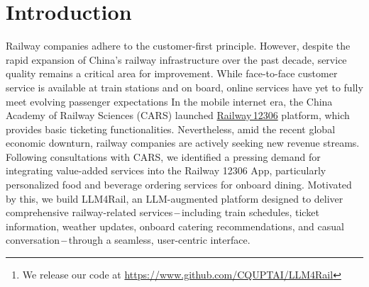 \documentclass[runningheads]{llncs}
\begin{document}
\begin{abstract}
Large language models (LLMs) have significantly reshaped different walks of business. 
To meet the increasing demands for individualized railway service, we develop LLM4Rail\footnote{We release our code at \href{https://www.github.com/CQUPTAI/LLM4Rail}{https://www.github.com/CQUPTAI/LLM4Rail}}\,\textbf{--}\,a novel LLM-augmented personalized railway services platform.
Empowered by the LLM, LLM4Rail provides dedicated modules for ticket and weather inquiries, food \& drink recommendations, and casual conversation.
In LLM4Rail, we propose the iterative ``Experience-Retrieval Question-Thought-Action-Observation (ER-QTAO)'' reasoning framework.
It introduces two key mechanisms, Experience Storage and Retrieval (ESR) and Diagnostic Observation Generation (DOG), to enhance the LLM's ability to invoke appropriate external tools with complex arguments.
To provide personalized onboard dining services, we first construct the 
Chinese Railway Food \& Drink (CRFD) dataset, which covers a wide range of 
signature dishes categorized by city, cuisine, age group, and spiciness 
level, and then develop an LLM-based zero-shot conversational recommender system  
for railway catering.
In addition, to address the unconstrained nature of generative recommendations, we design a feature-similarity-based alignment mechanism to ensure that all recommended items are aligned with entries in the CRFD dataset.


\end{abstract}
%
%
%
%
%
\section{Introduction}

Railway companies adhere to the customer-first principle. 
However, despite the rapid expansion of China's railway infrastructure over the past decade, service quality remains a critical area for improvement. 
While face-to-face customer service is available at train stations and on board, online services have yet to fully meet evolving passenger expectations
In the mobile internet era, the China Academy of Railway Sciences (CARS) launched \href{https://play.google.com/store/apps/details?id=com.chinarailway.globalticketing&hl=en&pli=1}{Railway\,12306} platform, which provides basic ticketing functionalities. 
Nevertheless, amid the recent global economic downturn, railway companies are actively seeking new revenue streams. 
Following consultations with CARS, we identified a pressing demand for integrating value-added services into the Railway 12306 App, particularly personalized food and beverage ordering services for onboard dining.
Motivated by this, we build LLM4Rail, an LLM-augmented platform designed to deliver comprehensive railway-related services\,\textbf{--}\,including train schedules, ticket information, weather updates, onboard catering recommendations, and casual conversation\,\textbf{--}\,through a seamless, user-centric interface.
\end{document}
